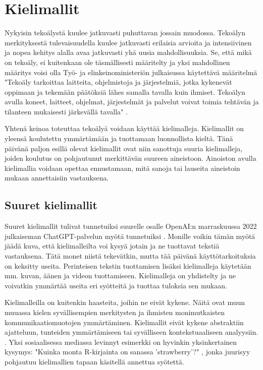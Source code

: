 \chapter{Kielimallit}
\label{ch:kielimallit}

Nykyisin tekoälystä kuulee jatkuvasti puhuttavan jossain muodossa. Tekoälyn
merkityksestä tulevaisuudella kuulee jatkuvasti erilaisia arvioita ja
intensiivinen ja nopea kehitys alalla avaa jatkuvasti yhä uusia
mahdollisuuksia. Se, että mikä on tekoäly, ei kuitenkaan ole täsmällisesti
määritelty ja yksi mahdollinen määritys voisi olla Työ- ja elinkeinoministeriön
julkaisussa käytettävä määritelmä "Tekoäly tarkoittaa laitteita, ohjelmistoja
ja järjestelmiä, jotka kykenevät oppimaan ja tekemään päätöksiä lähes samalla
tavalla kuin ihmiset. Tekoälyn avulla koneet, laitteet, ohjelmat, järjestelmät
ja palvelut voivat toimia tehtävän ja tilanteen mukaisesti järkevällä tavalla"
\parencite{valtioneuvostoSuomenTekoalyaika}.

Yhtenä keinoa toteuttaa tekoälyä voidaan käyttää kielimalleja. Kielimallit on
yleensä koulutettu ymmärtämään ja tuottamaan luonnollista kieltä. Tänä päivänä
paljon esillä olevat kielimallit ovat niin sanottuja suuria kielimalleja,
joiden koulutus on pohjautunut merkittävän suureen aineistoon. Ainoiston avulla
kielimallia voidaan opettaa ennustamaan, mitä sanoja tai lauseita aineistoin
mukaan annettaisiin vastauksena.

\section{Suuret kielimallit}

Suuret kielimallit tulivat tunnetuiksi suurelle osalle OpenAI:n marraskuussa
2022 julkaiseman ChatGPT-palvelun myötä tunnetuiksi
\parencite{alma9911564814005973}. Monille voikin tämän myötä jäädä kuva, että
kielimalleilta voi kysyä jotain ja ne tuottavat tekstiä vastauksena. Tätä monet
niistä tekevätkin, mutta tää päivänä käyttötarkoituksia on keksitty useita.
Perinteisen tekstin tuottamisen lisäksi kielimalleja käytetään mm. kuvan,
äänen ja videon tuottamiseen. Kielimalleja on yhdistelty ja ne voivatkin
ymmärtää useita eri syötteitä ja tuottaa tuloksia sen mukaan.

Kielimalleilla on kuitenkin haasteita, joihin ne eivät kykene. Näitä ovat muun
muuassa kielen syvällisempien merkitysten ja ihmisten monimutkaisten
kommunikaatiomuotojen ymmärtäminen. Kielimallit eivät kykene abstraktiin
ajatteluun, tunteiden ymmärtämiseen tai syvälliseen kontekstuaaliseen
analyysiin. \parencite{haukkaJimiKuinkakielimallitOppivat}. Yksi sosiaalisessa
mediassa levinnyt esimerkki on hyvinkin yksinkertainen kysymys: "Kuinka monta
R-kirjainta on sanassa 'strawberry'?" \parencite{alberttechStrawberry}, jonka
juurisyy pohjautuu kielimallien tapaan käsitellä annettua syötettä.

